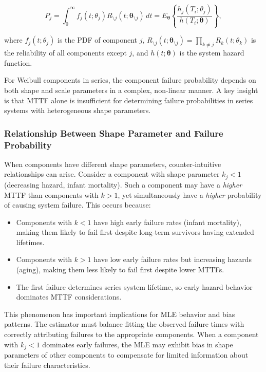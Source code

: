 \documentclass[11pt]{article}
\renewcommand{\v}[1]{\boldsymbol{#1}}
\begin{document}
\begin{equation}
\label{eq:component_failure_prob_hazard}
P_j = \int_{0}^\infty f_j(t; \theta_j) R_{\setminus j}(t; \v\theta_{\setminus j}) \, dt = E_{\v\theta}\left\{ \frac{h_j(T_i;\theta_j)}{h(T_i;\v\theta)} \right\},
\end{equation}

\noindent where $f_j(t; \theta_j)$ is the PDF of component $j$, $R_{\setminus j}(t; \v\theta_{\setminus j}) = \prod_{k \neq j} R_k(t; \theta_k)$ is the reliability of all components except $j$, and $h(t; \v\theta)$ is the system hazard function.

For Weibull components in series, the component failure probability depends on both shape and scale parameters in a complex, non-linear manner. A key insight is that MTTF alone is insufficient for determining failure probabilities in series systems with heterogeneous shape parameters.

\subsubsection*{Relationship Between Shape Parameter and Failure Probability}

When components have different shape parameters, counter-intuitive relationships can arise. Consider a component with shape parameter $k_j < 1$ (decreasing hazard, infant mortality). Such a component may have a \emph{higher} MTTF than components with $k > 1$, yet simultaneously have a \emph{higher} probability of causing system failure. This occurs because:

\begin{itemize}
\item Components with $k < 1$ have high early failure rates (infant mortality), making them likely to fail first despite long-term survivors having extended lifetimes.
\item Components with $k > 1$ have low early failure rates but increasing hazards (aging), making them less likely to fail first despite lower MTTFs.
\item The first failure determines series system lifetime, so early hazard behavior dominates MTTF considerations.
\end{itemize}

This phenomenon has important implications for MLE behavior and bias patterns. The estimator must balance fitting the observed failure times with correctly attributing failures to the appropriate components. When a component with $k_j < 1$ dominates early failures, the MLE may exhibit bias in shape parameters of other components to compensate for limited information about their failure characteristics.
\end{document}
